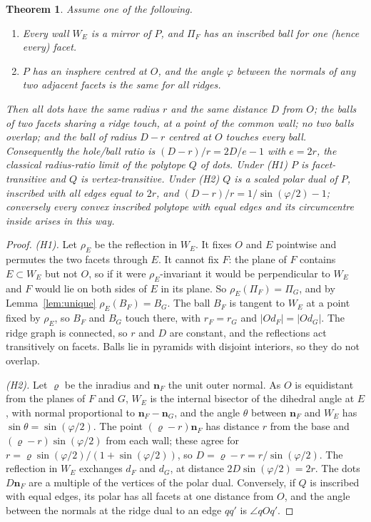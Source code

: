 \documentclass[11pt]{amsart}
\newtheorem{theorem}{Theorem}
\theoremstyle{definition}
\theoremstyle{remark}
\begin{document}
\begin{theorem}\label{thm:ratio}
Assume one of the following.
\begin{enumerate}[label=(H\arabic*),leftmargin=3em]
\item Every wall $W_E$ is a mirror of $P$, and $\Pi_F$ has an inscribed ball for one (hence every) facet.
\item $P$ has an insphere centred at $O$, and the angle $\varphi$ between the normals of any two adjacent facets is the same for all ridges.
\end{enumerate}
Then all dots have the same radius $r$ and the same distance $D$ from $O$; the balls of two facets sharing a ridge touch, at a point of the common wall; no two balls overlap; and the ball of radius $D-r$ centred at $O$ touches every ball. Consequently the hole/ball ratio is $(D-r)/r=2D/e-1$ with $e=2r$, the classical radius-ratio limit \cite{Pauling1929} of the polytope $Q$ of dots. Under (H1) $P$ is facet-transitive and $Q$ is vertex-transitive. Under (H2) $Q$ is a scaled polar dual of $P$, inscribed with all edges equal to $2r$, and $(D-r)/r=1/\sin(\varphi/2)-1$; conversely every convex inscribed polytope with equal edges and its circumcentre inside arises in this way.
\end{theorem}

\begin{proof}
\emph{(H1).} Let $\rho_E$ be the reflection in $W_E$. It fixes $O$ and $E$ pointwise and permutes the two facets through $E$. It cannot fix $F$: the plane of $F$ contains $E\subset W_E$ but not $O$, so if it were $\rho_E$-invariant it would be perpendicular to $W_E$ and $F$ would lie on both sides of $E$ in its plane. So $\rho_E(\Pi_F)=\Pi_G$, and by Lemma~\ref{lem:unique} $\rho_E(B_F)=B_G$. The ball $B_F$ is tangent to $W_E$ at a point fixed by $\rho_E$, so $B_F$ and $B_G$ touch there, with $r_F=r_G$ and $|Od_F|=|Od_G|$. The ridge graph is connected, so $r$ and $D$ are constant, and the reflections act transitively on facets. Balls lie in pyramids with disjoint interiors, so they do not overlap.

\emph{(H2).} Let $\varrho$ be the inradius and $\mathbf n_F$ the unit outer normal. As $O$ is equidistant from the planes of $F$ and $G$, $W_E$ is the internal bisector of the dihedral angle at $E$, with normal proportional to $\mathbf n_F-\mathbf n_G$, and the angle $\theta$ between $\mathbf n_F$ and $W_E$ has $\sin\theta=\sin(\varphi/2)$. The point $(\varrho-r)\mathbf n_F$ has distance $r$ from the base and $(\varrho-r)\sin(\varphi/2)$ from each wall; these agree for $r=\varrho\sin(\varphi/2)/(1+\sin(\varphi/2))$, so $D=\varrho-r=r/\sin(\varphi/2)$. The reflection in $W_E$ exchanges $d_F$ and $d_G$, at distance $2D\sin(\varphi/2)=2r$. The dots $D\mathbf n_F$ are a multiple of the vertices of the polar dual. Conversely, if $Q$ is inscribed with equal edges, its polar has all facets at one distance from $O$, and the angle between the normals at the ridge dual to an edge $qq'$ is $\angle qOq'$.
\end{proof}
\end{document}
